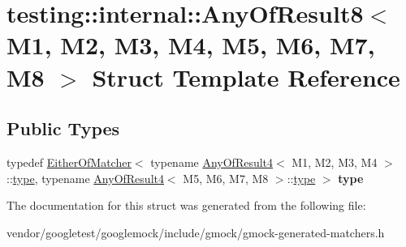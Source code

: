 \hypertarget{structtesting_1_1internal_1_1_any_of_result8}{}\section{testing\+:\+:internal\+:\+:Any\+Of\+Result8$<$ M1, M2, M3, M4, M5, M6, M7, M8 $>$ Struct Template Reference}
\label{structtesting_1_1internal_1_1_any_of_result8}
\subsection*{Public Types}
\begin{DoxyCompactItemize}
\item 
\mbox{\label{structtesting_1_1internal_1_1_any_of_result8_a8f8a1e78a019965c24bd22c78885747d}} 
typedef \mbox{\hyperlink{classtesting_1_1internal_1_1_either_of_matcher}{Either\+Of\+Matcher}}$<$ typename \mbox{\hyperlink{structtesting_1_1internal_1_1_any_of_result4}{Any\+Of\+Result4}}$<$ M1, M2, M3, M4 $>$\+::\mbox{\hyperlink{classtesting_1_1internal_1_1_either_of_matcher}{type}}, typename \mbox{\hyperlink{structtesting_1_1internal_1_1_any_of_result4}{Any\+Of\+Result4}}$<$ M5, M6, M7, M8 $>$\+::\mbox{\hyperlink{classtesting_1_1internal_1_1_either_of_matcher}{type}} $>$ {\bfseries type}
\end{DoxyCompactItemize}


The documentation for this struct was generated from the following file\+:\begin{DoxyCompactItemize}
\item 
vendor/googletest/googlemock/include/gmock/gmock-\/generated-\/matchers.\+h\end{DoxyCompactItemize}
